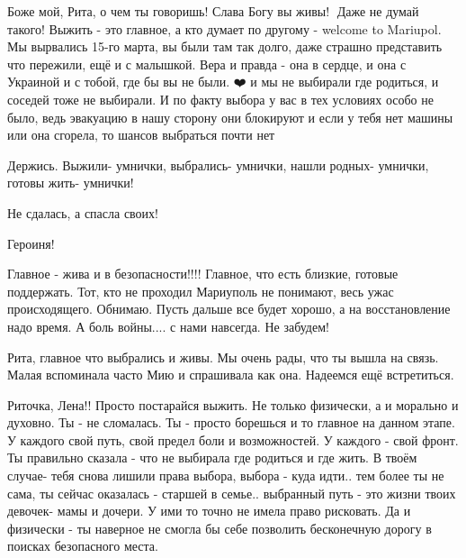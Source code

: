  
 
 
 
 

\qqSecCmt


Боже мой, Рита, о чем ты говоришь! Слава Богу вы живы! 🙏Даже не думай такого!
Выжить - это главное, а кто думает по другому - welcome to Mariupol. Мы
вырвались 15-го марта, вы были там так долго, даже страшно представить что
пережили, ещё и с малышкой. Вера и правда - она в сердце, и она с Украиной и с
тобой, где бы вы не были. ❤️ и мы не выбирали где родиться, и соседей тоже не
выбирали. И по факту выбора у вас в тех условиях особо не было, ведь эвакуацию
в нашу сторону они блокируют и если у тебя нет машины или она сгорела, то
шансов выбраться почти нет


Держись. Выжили- умнички, выбрались- умнички, нашли родных- умнички, готовы жить- умнички!

Не сдалась, а спасла своих!

Героиня!


Главное - жива и в безопасности!!!! Главное, что есть близкие, готовые
поддержать. Тот, кто не проходил Мариуполь не понимают, весь ужас
происходящего. Обнимаю. Пусть дальше все будет хорошо, а на восстановление надо
время. А боль войны.... с нами навсегда. Не забудем!


Рита, главное что выбрались и живы. Мы очень рады, что ты вышла на связь. Малая
вспоминала часто Мию и спрашивала как она. Надеемся ещё встретиться.


Риточка, Лена!! Просто постарайся выжить. Не только физически, а и морально и
духовно. Ты - не сломалась. Ты - просто борешься и то главное на данном этапе.
У каждого свой путь, свой предел боли и возможностей. У каждого - свой фронт. Ты
правильно сказала - что не выбирала где родиться и где жить. В твоём случае-
тебя снова лишили права выбора, выбора - куда идти.. тем более ты не сама, ты
сейчас оказалась - старшей в семье.. выбранный путь - это жизни твоих девочек-
мамы и дочери. У ими то точно не имела право рисковать. Да и физически - ты
наверное не смогла бы себе позволить бесконечную дорогу в поисках безопасного
места.

